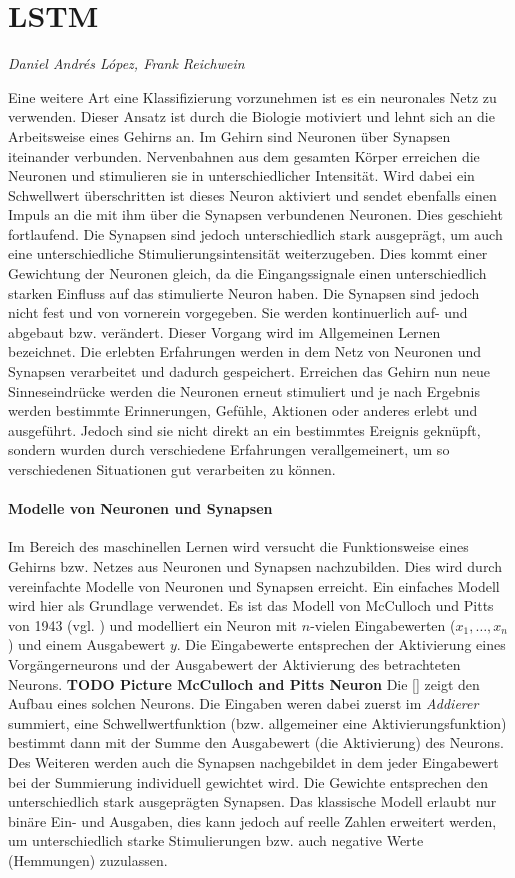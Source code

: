 \section{\acl{LSTM}}
\textit{Daniel Andrés López, Frank Reichwein}

Eine weitere Art eine Klassifizierung vorzunehmen ist es ein neuronales Netz zu
verwenden. Dieser Ansatz ist durch die Biologie motiviert und lehnt sich an die
Arbeitsweise eines Gehirns an. Im Gehirn sind Neuronen über Synapsen iteinander
verbunden. Nervenbahnen aus dem gesamten Körper erreichen die Neuronen und
stimulieren sie in unterschiedlicher Intensität. Wird dabei ein Schwellwert
überschritten ist dieses Neuron aktiviert und sendet ebenfalls einen Impuls an
die mit ihm über die Synapsen verbundenen Neuronen. Dies geschieht fortlaufend.
Die Synapsen sind jedoch unterschiedlich stark ausgeprägt, um auch eine
unterschiedliche Stimulierungsintensität weiterzugeben. Dies kommt einer
Gewichtung der Neuronen gleich, da die Eingangssignale einen unterschiedlich
starken Einfluss auf das stimulierte Neuron haben. Die Synapsen sind jedoch
nicht fest und von vornerein vorgegeben. Sie werden kontinuerlich auf- und
abgebaut bzw. verändert. Dieser Vorgang wird im Allgemeinen Lernen bezeichnet.
Die erlebten Erfahrungen werden in dem Netz von Neuronen und Synapsen
verarbeitet und dadurch gespeichert. Erreichen das Gehirn nun neue
Sinneseindrücke werden die Neuronen erneut stimuliert und je nach Ergebnis
werden bestimmte Erinnerungen, Gefühle, Aktionen oder anderes erlebt und
ausgeführt. Jedoch sind sie nicht direkt an ein bestimmtes Ereignis geknüpft,
sondern wurden durch verschiedene Erfahrungen verallgemeinert, um so
verschiedenen Situationen gut verarbeiten zu können. 

\paragraph{Modelle von Neuronen und Synapsen}
Im Bereich des maschinellen Lernen wird versucht die Funktionsweise eines
Gehirns bzw. Netzes aus Neuronen und Synapsen nachzubilden. Dies wird durch
vereinfachte Modelle von Neuronen und Synapsen erreicht. Ein einfaches Modell
wird hier als Grundlage verwendet. Es ist das Modell von McCulloch und Pitts von
1943 (vgl. \cite{Mcc43}) und modelliert ein Neuron mit $n$-vielen Eingabewerten
($x_1,\ldots,x_n$) und einem Ausgabewert $y$. Die Eingabewerte entsprechen der
Aktivierung eines Vorgängerneurons und der Ausgabewert der Aktivierung des
betrachteten Neurons.
\textbf{TODO Picture McCulloch and Pitts Neuron} Die \autoref{} zeigt den Aufbau
eines solchen Neurons. Die Eingaben weren dabei zuerst im \textit{Addierer}
summiert, eine Schwellwertfunktion (bzw. allgemeiner eine Aktivierungsfunktion)
bestimmt dann mit der Summe den Ausgabewert (die Aktivierung) des Neurons. Des
Weiteren werden auch die Synapsen nachgebildet in dem jeder Eingabewert bei der
Summierung individuell gewichtet wird. Die Gewichte entsprechen den
unterschiedlich stark ausgeprägten Synapsen. Das klassische Modell erlaubt nur
binäre Ein- und Ausgaben, dies kann jedoch auf reelle Zahlen erweitert werden,
um unterschiedlich starke Stimulierungen bzw. auch negative Werte (Hemmungen)
zuzulassen.

